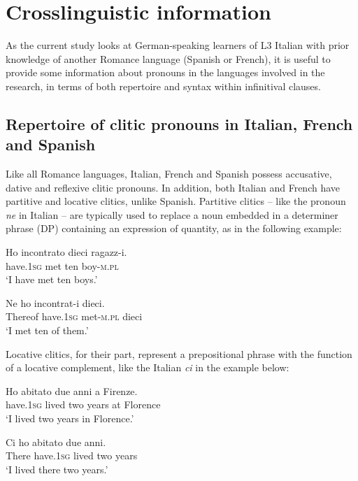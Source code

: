 \documentclass[output=paper,modfonts,nonflat,newtxmath]{langsci/langscibook}
\begin{document}
\section{Crosslinguistic information}%
\label{sec:sciutti:2}

As the current study looks at German-speaking learners of L3 Italian with prior knowledge of another Romance language (Spanish or French), it is useful to provide some information about pronouns in the languages involved in the research, in terms of both repertoire and syntax within infinitival clauses.

\subsection{{Repertoire} {of} {clitic} {pronouns} {in} {Italian,} {French} {and} {Spanish}}%
\label{sec:sciutti:2.1}

Like all Romance languages, Italian, French and Spanish possess accusative, dative and reflexive clitic pronouns. In addition, both Italian and French have partitive and locative clitics, unlike Spanish. Partitive clitics – like the pronoun \textit{ne} in Italian – are typically used to replace a noun embedded in a determiner phrase (DP) containing an expression of quantity, as in the following example:


\ea \label{ex:sciutti:1}
\begin{xlist}
    \ex \label{ex:sciutti:1a}
    \gll Ho incontrato dieci ragazz-i.\\
        have.\textsc{1sg} met ten boy-\textsc{m.pl}\\
    \glt  ‘I have met ten boys.’

    \ex \label{ex:sciutti:1b}
    \gll Ne ho incontrat-i dieci.\\
        Thereof have.\textsc{1sg} met-\textsc{m.pl} dieci \\
    \glt ‘I met ten of them.’

\end{xlist}
\z


Locative clitics, for their part, represent a prepositional phrase with the function of a locative complement, like the Italian \textit{ci} in the example below:

\ea \label{ex:sciutti:2}
\begin{xlist}
    \ex \label{ex:sciutti:2a}
    \gll Ho abitato due anni a Firenze.\\
        have.\textsc{1sg} lived two years at Florence\\
    \glt  ‘I lived two years in Florence.’

    \ex \label{ex:sciutti:2b}
    \gll Ci ho abitato due anni.\\
        There have.\textsc{1sg} lived two years\\
    \glt ‘I lived there two years.’

\end{xlist}
\z
\end{document}
